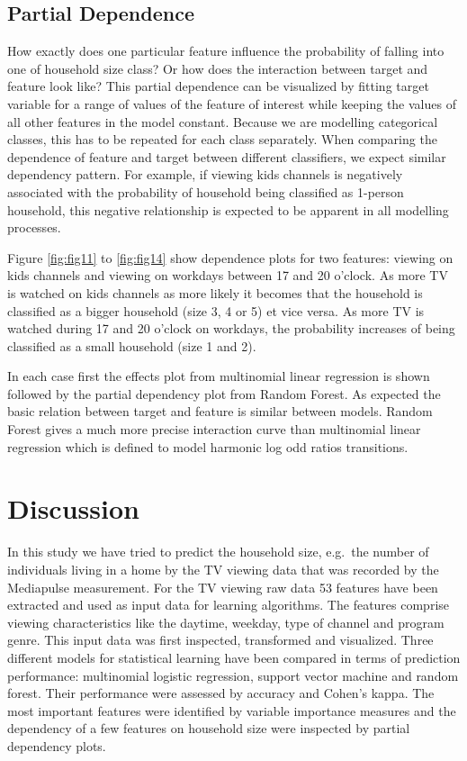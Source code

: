 \documentclass[]{article}
\begin{document}
\hypertarget{partial-dependence}{%
\subsection{Partial Dependence}\label{partial-dependence}}

How exactly does one particular feature influence the probability of
falling into one of household size class? Or how does the interaction
between target and feature look like? This partial dependence can be
visualized by fitting target variable for a range of values of the
feature of interest while keeping the values of all other features in
the model constant. Because we are modelling categorical classes, this
has to be repeated for each class separately. When comparing the
dependence of feature and target between different classifiers, we
expect similar dependency pattern. For example, if viewing kids channels
is negatively associated with the probability of household being
classified as 1-person household, this negative relationship is expected
to be apparent in all modelling processes.

Figure \ref{fig:fig11} to \ref{fig:fig14} show dependence plots for two
features: viewing on kids channels and viewing on workdays between 17
and 20 o'clock. As more TV is watched on kids channels as more likely it
becomes that the household is classified as a bigger household (size 3,
4 or 5) et vice versa. As more TV is watched during 17 and 20 o'clock on
workdays, the probability increases of being classified as a small
household (size 1 and 2).

In each case first the effects plot from multinomial linear regression
is shown followed by the partial dependency plot from Random Forest. As
expected the basic relation between target and feature is similar
between models. Random Forest gives a much more precise interaction
curve than multinomial linear regression which is defined to model
harmonic log odd ratios transitions.

\hypertarget{discussion}{%
\section{Discussion}\label{discussion}}

In this study we have tried to predict the household size, e.g.~the
number of individuals living in a home by the TV viewing data that was
recorded by the Mediapulse measurement. For the TV viewing raw data 53
features have been extracted and used as input data for learning
algorithms. The features comprise viewing characteristics like the
daytime, weekday, type of channel and program genre. This input data was
first inspected, transformed and visualized. Three different models for
statistical learning have been compared in terms of prediction
performance: multinomial logistic regression, support vector machine and
random forest. Their performance were assessed by accuracy and Cohen's
kappa. The most important features were identified by variable
importance measures and the dependency of a few features on household
size were inspected by partial dependency plots.
\end{document}
